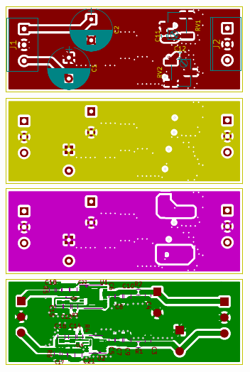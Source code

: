 \documentclass[10pt,fleqn]{article}
\begin{document}
\begin{center}
  \includegraphics[width=\textwidth]{regulator-F.pdf}\\
  \includegraphics[width=\textwidth]{regulator-In1.pdf}\\
  \includegraphics[width=\textwidth]{regulator-In2.pdf}\\
  \includegraphics[width=\textwidth]{regulator-B.pdf}
\end{center}
\end{document}

